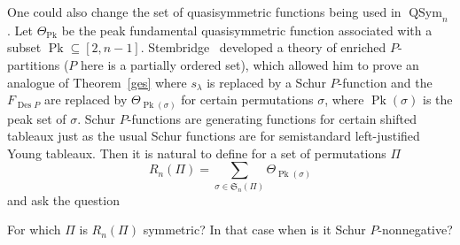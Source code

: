 \documentclass[ALCO,ThmDefs,Unicode,epreuves]{cedram}
\DeclareMathOperator{\Pk}{Pk}
\newcommand{\sbe}{\subseteq}
\newcommand{\la}{\lambda}
\newcommand{\si}{\sigma}
\newcommand{\Th}{\Theta}
\newcommand{\fS}{{\mathfrak S}}
\DeclareMathOperator{\Des}{Des}
\DeclareMathOperator{\QSym}{{QSym}}
\begin{document}
One could also change the set of quasisymmetric functions being used in $\QSym_n$. Let $\Th_{\Pk}$ be the peak fundamental quasisymmetric function associated with a subset $\Pk\sbe[2,n-1]$. Stembridge~\cite{ste:epp} developed a theory of enriched $P$-partitions ($P$ here is a partially ordered set), which allowed him to prove an analogue of Theorem~\ref{ges} where $s_\la$ is replaced by a Schur $P$-function and the $F_{\Des P}$ are replaced by $\Th_{\Pk(\si)}$ for certain permutations $\si$, where $\Pk(\si)$ is the peak set of $\si$. Schur $P$-functions are generating functions for certain shifted tableaux just as the usual Schur functions are for semistandard left-justified Young tableaux. Then it is natural to define for a set of permutations $\Pi$
\[
R_n(\Pi)=\sum_{\si\in\fS_n(\Pi)} \Th_{\Pk(\si)}
\]
and ask the question
\begin{question}
For which $\Pi$ is $R_n(\Pi)$ symmetric? In that case when is it Schur $P$-nonnegative?
\end{question}






\end{document}
